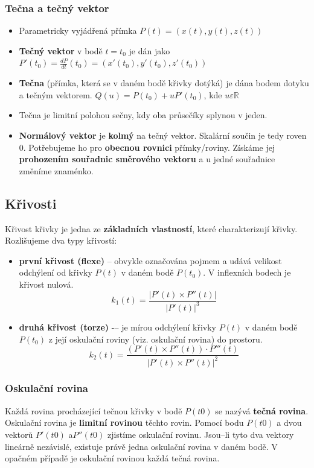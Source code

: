 \subsubsection*{Tečna a tečný vektor}
\begin{itemize}
	\item Parametricky vyjádřená přímka $P(t) = (x(t), y(t), z(t))$
	\item \textbf{Tečný vektor} v bodě $t=t_0$ je dán jako $P'(t_0) = \frac{dP}{dt}(t_0) = (x'(t_0), y'(t_0), z'(t_0))$
	\item \textbf{Tečna} (přímka, která se v daném bodě křivky dotýká) je dána bodem dotyku a tečným vektorem. $Q(u) = P(t_0) + uP'(t_0)$, kde $u \varepsilon \mathbb{R}$
	\item Tečna je limitní polohou sečny, kdy oba průsečíky splynou v jeden.
\end{itemize}
\begin{itemize}
	\item \textbf{Normálový vektor} je \textbf{kolmý} na tečný vektor. Skalární součin je tedy roven 0. Potřebujeme ho pro \textbf{obecnou rovnici} přímky/roviny. Získáme jej \textbf{prohozením souřadnic směrového vektoru} a u jedné souřadnice změníme znaménko.
\end{itemize}
\subsection{Křivosti}
Křivost křivky je jedna ze \textbf{základních vlastností}, které charakterizují křivky. Rozlišujeme dva typy křivostí:
\begin{itemize}
	\item \textbf{první křivost (flexe)} -- obvykle označována pojmem  a udává velikost odchýlení od křivky $P(t)$ v daném bodě $P(t_0)$. V inflexních bodech je křivost nulová.
		\begin{equation*}
				k_1(t) = \frac{|P'(t) \times P''(t)|}{|P'(t)|^3}
	\end{equation*}
	\item \textbf{druhá křivost (torze)} -– je mírou odchýlení křivky $P(t)$ v daném bodě $P(t_0)$ z její oskulační roviny (viz. oskulační rovina) do prostoru.
	\begin{equation*}
				k_2(t) = \frac{(P'(t) \times P''(t)) \cdot P'''(t)}{|P'(t) \times P''(t)|^2}
	\end{equation*}
\end{itemize}
\subsubsection{Oskulační rovina}
Každá rovina procházející tečnou křivky v bodě $P(t0)$ se nazývá \textbf{tečná rovina}. Oskulační rovina je \textbf{limitní rovinou} těchto rovin. Pomocí bodu $P(t0)$ a dvou vektorů $P'(t0)$ a$ P''(t0)$ zjistíme oskulační rovinu. Jsou--li tyto dva vektory lineárně nezávislé, existuje právě jedna oskulační rovina v daném bodě. V opačném případě je oskulační rovinou každá tečná rovina.

